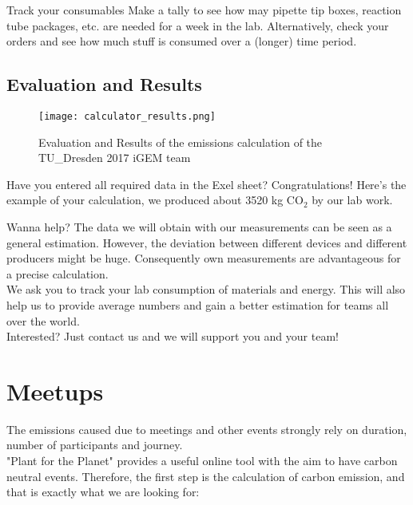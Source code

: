 \begin{suggest}{Track your consumables}
	Make a tally to see how may pipette tip boxes, reaction tube packages, etc. are needed for a week in the lab. Alternatively, check your orders and see how much stuff is consumed over a (longer) time period.
\end{suggest}

\subsection{Evaluation and Results}
\begin{wrapfigure}{r}{8cm}
	\centering
	\texttt{[image: calculator\_results.png]}%
	\caption{Evaluation and Results of the emissions calculation of the TU\_Dresden 2017 iGEM team}%
\end{wrapfigure}

Have you entered all required data in the Exel sheet? Congratulations! Here’s the example of your calculation, we produced about 3520 kg CO$_2$ by our lab work.



\begin{suggest}{Wanna help?}
	The data we will obtain with our measurements can be seen as a general estimation.
	However, the deviation between different devices and different producers might be huge. Consequently own measurements are advantageous for a precise calculation.\\
	We ask you to track your lab consumption of materials and energy. This will also help us to provide average numbers and gain a better estimation for teams all over the world. \\
	Interested? Just contact us and we will support you and your team!
	
\end{suggest}

\section{Meetups}

The emissions caused due to meetings and other events strongly rely on duration, number of participants and journey. \\
"Plant for the Planet" provides a useful online tool with the aim to have carbon neutral events. Therefore, the first step is the calculation of carbon emission, and that is exactly what we are looking for:

